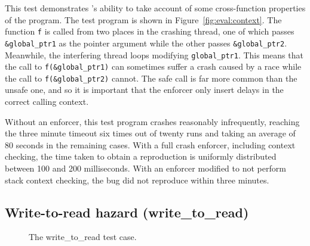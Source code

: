 This test demonstrates {\technique}'s ability to take account of some
cross-function properties of the program.  The test program is shown
in Figure~\ref{fig:eval:context}.  The function \texttt{f} is called
from two places in the crashing thread, one of which passes
\texttt{\&global\_ptr1} as the pointer argument while the other passes
\texttt{\&global\_ptr2}.  Meanwhile, the interfering thread loops
modifying \texttt{global\_ptr1}.  This means that the call to
\texttt{f(\&global\_ptr1)} can sometimes suffer a crash caused by a
race while the call to \texttt{f(\&global\_ptr2)} cannot.  The safe
call is far more common than the unsafe one, and so it is important
that the enforcer only insert delays in the correct calling context.

Without an enforcer, this test program crashes reasonably
infrequently, reaching the three minute timeout six times out of
twenty runs and taking an average of 80 seconds in the remaining
cases.  With a full crash enforcer, including context checking, the
time taken to obtain a reproduction is uniformly distributed between
100 and 200 milliseconds.  With an enforcer modified to not perform
stack context checking, the bug did not reproduce within three
minutes.


\subsection{Write-to-read hazard (write\_to\_read)}

\begin{figure}
  \hfill
  \caption{The write\_to\_read test case.}
  \label{fig:eval:write_to_read}
\end{figure}

